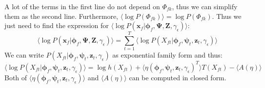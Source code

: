 \documentclass[11pt]{article} %
\begin{document}
A lot of the terms in the first line do not depend on $\Phi_{fk}$, thus we can simplify them as the second line. Furthermore, $\langle \log P(\Phi_{fk}) \rangle = \log P(\Phi_{fk})$. Thus we just need to find the expression for $\langle \log P(\bm{x}_f | \bm{\phi}_f, \bm{\Psi}, \mathbf{Z}, \gamma_\epsilon)\rangle$:
\[
\langle \log P(\bm{x}_f | \bm{\phi}_f, \bm{\Psi}, \mathbf{Z}, \gamma_\epsilon)\rangle = \sum_{t=1}^T \langle \log P(X_{ft} | \bm{\phi}_f, \bm{\psi}_{t}, \bm{z}_{t}, \gamma_\epsilon)\rangle
\]
We can write $P(X_{ft} | \bm{\phi}_f, \bm{\psi}_{t}, \bm{z}_{t}, \gamma_\epsilon)$ as exponential family form and thus:
\[
\langle \log P(X_{ft} | \bm{\phi}_f, \bm{\psi}_{t}, \bm{z}_{t}, \gamma_\epsilon) \rangle = \log h(X_{ft}) + \langle \eta(\bm{\phi}_f, \bm{\psi}_t, \bm{z}_t, \gamma_\epsilon)^T \rangle T(X_{ft}) - \langle A(\eta) \rangle
\]
Both of $\langle \eta(\bm{\phi}_f, \bm{\psi}_t, \bm{z}_t, \gamma_\epsilon) \rangle$ and $\langle A(\eta) \rangle$ can be computed in closed form.
\end{document}
